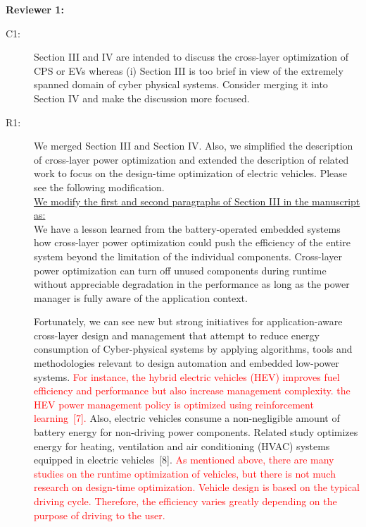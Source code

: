 \documentclass[onecolumn]{IEEEconf}
\begin{document}
\setlength{\parindent}{0cm}
\textbf{Reviewer 1:}
\begin{description}
\item [C1: ] Section III and IV are intended to discuss the cross-layer optimization of CPS or EVs whereas (i) Section III is too brief in view of the extremely spanned domain of cyber physical systems. Consider merging it into Section IV and make the discussion more focused.  
\item [R1: ] We merged Section III and Section IV. Also, we simplified the description of cross-layer power optimization and extended the description of related work to focus on the design-time optimization of electric vehicles. Please see the following modification.\\

\underline{We modify the first and second paragraphs of Section III in the manuscript as:}\\
We have a lesson learned from the battery-operated embedded systems how cross-layer power optimization could push the efficiency of the entire system beyond the limitation of the individual components. Cross-layer power optimization can turn off unused components during runtime without appreciable degradation in the performance as long as the power manager is fully aware of the application context. 

Fortunately, we can see new but strong initiatives for application-aware cross-layer design and management that attempt to reduce energy consumption of Cyber-physical systems by applying algorithms, tools and methodologies relevant to design automation and embedded low-power systems. \textcolor{red}{For instance, the hybrid electric vehicles (HEV) improves fuel efficiency and performance but also increase management complexity. the HEV power management policy is optimized using reinforcement learning~[7].} Also, electric vehicles consume a non-negligible amount of battery energy for non-driving power components. Related study optimizes energy for heating, ventilation and air conditioning (HVAC) systems equipped in electric vehicles~[8].
\textcolor{red}{As mentioned above, there are many studies on the runtime optimization of vehicles, but there is not much research on design-time optimization. Vehicle design is based on the typical driving cycle. Therefore, the efficiency varies greatly depending on the purpose of driving to the user.}
~\\


\end{description}
\end{document}
